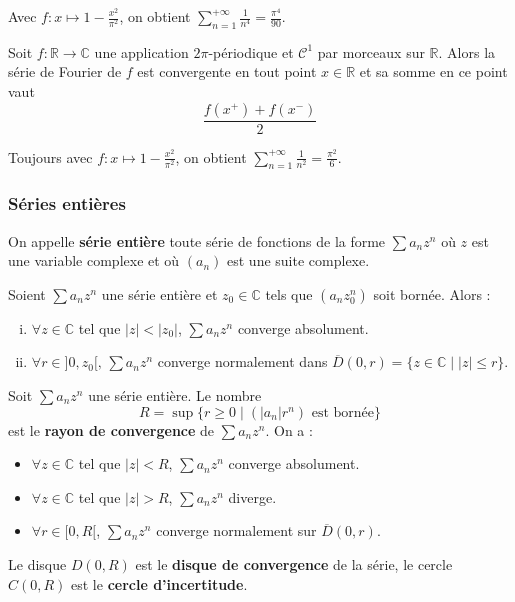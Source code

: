 	\begin{example}
		Avec $f : x \mapsto 1 - \frac{x^2}{\pi^2}$, on obtient $\sum_{n=1}^{+\infty} \frac{1}{n^4} = \frac{\pi^4}{90}$.
	\end{example}
	
	\begin{theorem}
		Soit $f : \mathbb{R} \rightarrow \mathbb{C}$ une application $2\pi$-périodique et $\mathcal{C}^1$ par morceaux sur $\mathbb{R}$. Alors la série de Fourier de $f$ est convergente en tout point $x \in \mathbb{R}$ et sa somme en ce point vaut
		\[ \frac{f(x^+) + f(x^-)}{2} \]
	\end{theorem}
	
	\begin{example}
		Toujours avec $f : x \mapsto 1 - \frac{x^2}{\pi^2}$, on obtient $\sum_{n=1}^{+\infty} \frac{1}{n^2} = \frac{\pi^2}{6}$.
	\end{example}
	
	\subsubsection{Séries entières}
	
	
	\begin{definition}
		On appelle \textbf{série entière} toute série de fonctions de la forme $\sum a_n z^n$ où $z$ est une variable complexe et où $(a_n)$ est une suite complexe.
	\end{definition}
	
	\begin{lemma}[Abel]
		Soient $\sum a_n z^n$ une série entière et $z_0 \in \mathbb{C}$ tels que $(a_n z_0^n)$ soit bornée. Alors :
		\begin{enumerate}[(i)]
			\item $\forall z \in \mathbb{C}$ tel que $|z| < |z_0|$, $\sum a_n z^n$ converge absolument.
			\item $\forall r \in ]0,z_0[, \, \sum a_n z^n$ converge normalement dans $\overline{D}(0, r) = \{ z \in \mathbb{C} \mid |z| \leq r \}$.
		\end{enumerate}
	\end{lemma}
	
	\begin{definition}
		Soit $\sum a_n z^n$ une série entière. Le nombre
		\[ R = \sup \{ r \geq 0 \mid (|a_n|r^n) \text{ est bornée} \} \]
		est le \textbf{rayon de convergence} de $\sum a_n z^n$. On a :
		\begin{itemize}
			\item $\forall z \in \mathbb{C}$ tel que $|z| < R$, $\sum a_n z^n$ converge absolument.
			\item $\forall z \in \mathbb{C}$ tel que $|z| > R$, $\sum a_n z^n$ diverge.
			\item $\forall r \in [0,R[$, $\sum a_n z^n$ converge normalement sur $\overline{D}(0,r)$.
		\end{itemize}
		Le disque $D(0,R)$ est le \textbf{disque de convergence} de la série, le cercle $C(0,R)$ est le \textbf{cercle d'incertitude}.
	\end{definition}
	
